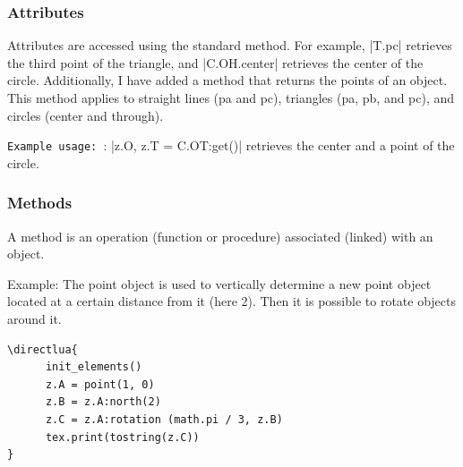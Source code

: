 \subsubsection{Attributes}
 \label{ssub:attributes}

Attributes are accessed using the standard method. For example, |T.pc| retrieves the third point of the triangle, and |C.OH.center| retrieves the center of the circle. Additionally, I have added a method  that returns the points of an object. This method applies to straight lines (pa and pc), triangles (pa, pb, and pc), and circles (center and through).

\vspace{1em}

  \texttt{Example usage: }: |z.O, z.T = C.OT:get()| retrieves the center and a point of the circle.

\subsubsection{Methods}
\label{ssub:methods}

A method is an operation (function or procedure) associated (linked) with an object.

Example:   The point object is used to vertically determine a new point object located at a certain distance from it (here 2). Then it is possible to rotate objects around it.

\begin{mbox}{}
\begin{verbatim}
\directlua{
      init_elements()
      z.A = point(1, 0)
      z.B = z.A:north(2)
      z.C = z.A:rotation (math.pi / 3, z.B)
      tex.print(tostring(z.C))
}
\end{verbatim}
\end{mbox}

\endinput
